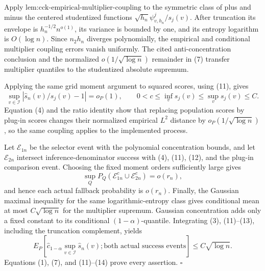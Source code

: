 Apply \(\text{lem:cck-empirical-multiplier-coupling}\) to the symmetric class of plus and minus the centered studentized functions \(\sqrt{h_n}\psi^j_{v,h_n}/s_j(v)\). After truncation its envelope is \(h_n^{-1/2}n^{o(1)}\), its variance is bounded by one, and its entropy logarithm is \(O(\log n)\). Since \(n_2h_n\) diverges polynomially, the empirical and conditional multiplier coupling errors vanish uniformly. The cited anti-concentration conclusion and the normalized \(o(1/\sqrt{\log n})\) remainder in (7) transfer multiplier quantiles to the studentized absolute supremum.

Applying the same grid moment argument to squared scores, using (11), gives
\[
 \sup_{v\in\mathcal I}\left|\widehat s_n(v)/s_j(v)-1\right|=o_P(1),
 \qquad 0<c\le\inf_v s_j(v)\le\sup_v s_j(v)\le C. \tag{12}
\]
Equation (4) and the ratio identity show that replacing population scores by plug-in scores changes their normalized empirical \(L^2\) distance by \(o_P(1/\sqrt{\log n})\), so the same coupling applies to the implemented process.

Let \(\mathcal E_{1n}\) be the selector event with the polynomial concentration bounds, and let \(\mathcal E_{2n}\) intersect inference-denominator success with (4), (11), (12), and the plug-in comparison event. Choosing the fixed moment orders sufficiently large gives
\[
 \sup_QP_Q(\mathcal E_{1n}^c\cup\mathcal E_{2n}^c)=o(r_n), \tag{13}
\]
and hence each actual fallback probability is \(o(r_n)\). Finally, the Gaussian maximal inequality for the same logarithmic-entropy class gives conditional mean at most \(C\sqrt{\log n}\) for the multiplier supremum. Gaussian concentration adds only a fixed constant to its conditional \((1-\alpha)\)-quantile. Integrating (3), (11)--(13), including the truncation complement, yields
\[
 E_P\left[\widehat c_{1-\alpha}\sup_{v\in\mathcal I}\widehat s_n(v);
 \text{both actual success events}\right]\le C\sqrt{\log n}. \tag{14}
\]
Equations (1), (7), and (11)--(14) prove every assertion. \(\square\)